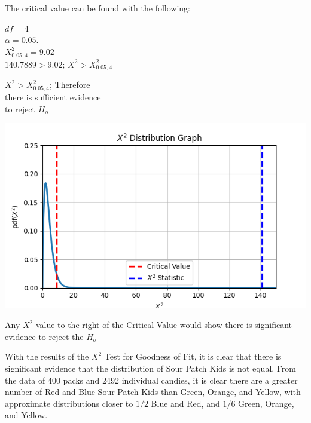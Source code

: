 \documentclass{article}
\begin{document}
	\begin{minipage}[t]{0.4\textwidth}
		\vspace{0.475cm}
		The critical value can be found with the following: \vspace{0.3cm}
		
		\hspace{0.4cm}
		\begin{minipage}{\dimexpr\linewidth-0.5cm}
    		$df=4$ \\
    		$\alpha = 0.05$. \\
    		$X^{2}_{0.05,4}=9.02$ \\
    		$140.7889>9.02$; $X^{2}>X^{2}_{0.05,4}$
		\end{minipage}
		
		\vspace{0.5cm}
		\begin{center}
			$X^{2}>X^{2}_{0.05,4}$; Therefore \\
			there is sufficient evidence \\
			to reject $H_o$
		\end{center}

	\end{minipage}
	\hfill
	\begin{minipage}[t]{0.5\textwidth}
		\vspace{0cm}
		\centering
    	\includegraphics[width=1 \textwidth]{chisquaregraph.png}

		Any $X^{2}$ value to the right of the Critical Value would show there is significant evidence to reject the $H_{o}$
	\end{minipage}

	\vspace{0.25cm}

	With the results of the $X^{2}$ Test for Goodness of Fit, it is clear that there is significant evidence that the distribution of Sour Patch Kids is not equal. From the data of 400 packs and 2492 individual candies, it is clear there are a greater number of Red and Blue Sour Patch Kids than Green, Orange, and Yellow, with approximate distributions closer to $1/2$ Blue and Red, and $1/6$ Green, Orange, and Yellow.
\end{document}
